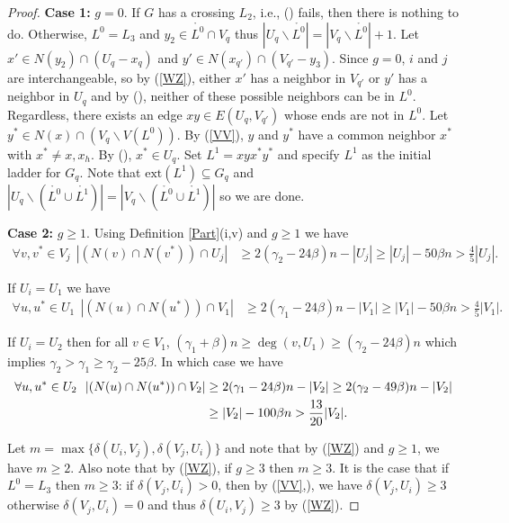 \documentclass[oneside,12pt]{memoir}
\newcommand{\g}{\gamma}
\newcommand{\aster}{\textasteriskcentered}
\newcommand{\ssm}{\smallsetminus}
\begin{document}
\begin{proof}
\noindent\textbf{Case 1:} $g=0$. If $G$ has a crossing $L_2$, i.e., (\aster) fails, then there is nothing to do. 
Otherwise, $L^0=L_3$ and $y_2\in \mathring{L^0}\cap V_q$ thus $|U_q\ssm\mathring{L^0}|=|V_q\ssm\mathring{L^0}|+1$. Let $x'\in N(y_2)\cap (U_q-x_q)$ and $y'\in N(x_{q'})\cap (V_{q'}-y_3)$.  Since $g=0$, $i$ and $j$ are interchangeable, so by (\ref{WZ}), either $x'$ has a neighbor in $V_{q'}$ or $y'$ has a neighbor in $U_q$ and by (\aster), neither of these possible neighbors can be in $L^0$. Regardless, there exists an edge $xy\in E(U_q,V_{q'})$ whose ends are not in $L^0$. Let $y^*\in N(x)\cap (V_q\ssm V(L^0))$. By (\ref{VV}), $y$ and $y^*$ have a common neighbor $x^*$  with $x^*\ne x,x_h$. By (\aster), $x^*\in U_q$. Set $L^1=xyx^*y^*$ and specify $L^1$ as the initial ladder for $G_q$. Note that $\mathrm{ext}(L^1)\subseteq G_q$ and $|U_q\ssm (\mathring{L^0}\cup\mathring{L^1})|=|V_q\ssm (\mathring{L^0}\cup\mathring{L^1})|$ so we are done.




\noindent\textbf{Case 2:}  $g\ge1$. 
Using Definition \ref{Part}(i,v) and $g\ge1$ we have  
\begin{align}
\forall v,v^*\in V_{j}~~|(N(v)\cap N(v^*))\cap U_{j}|&\geq 2(\g_2-24\beta)n-|U_j|\ge |U_j|-50\beta n >
\frac{4}{5}|U_{j}|.
\label{com1}
\end{align}

If $U_i=U_1$ we have
\begin{align}
\forall u,u^*\in U_1~~
|(N(u)\cap N(u^*))\cap V_1|&\geq 2(\g_1-24\beta)n-|V_1|\ge |V_1|-50\beta n >
\frac{4}{5}|V_{1}|.
\label{com2}
\end{align}

If $U_i=U_2$ then for all $v\in V_1$, $(\g_1+\beta)n\geq \deg(v,U_1)\geq(\g_2-24\beta)n$ which implies $\g_2>\g_1\geq\g_2-25\beta$.  In which case we have
\begin{align}
\forall u,u^*\in U_2~~
|(N(u)\cap N(u^*))\cap V_2|&\geq 2(\g_1-24\beta)n-|V_2| \geq 2(\g_2-49\beta)n-|V_2|\notag\\
&\geq |V_2|-100\beta n
>\frac{13}{20}|V_2|.
\label{com3}
\end{align}%

Let $m=\max\{\delta(U_i,V_j),\delta(V_j,U_i)\}$ and note that by (\ref{WZ}) and $g\geq 1$, we have $m\geq 2$.  Also note that by (\ref{WZ}), if $g\geq 3$ then $m\geq 3$.  It is the case that if $L^0=L_3$ then $m\geq 3$: if $\delta(V_j,U_i)>0$, then by (\ref{VV},\aster), we have $\delta(V_j,U_i)\geq 3$ otherwise $\delta(V_j,U_i)=0$ and thus $\delta(U_i,V_j)\geq 3$ by (\ref{WZ}).


\end{proof}
\end{document}
